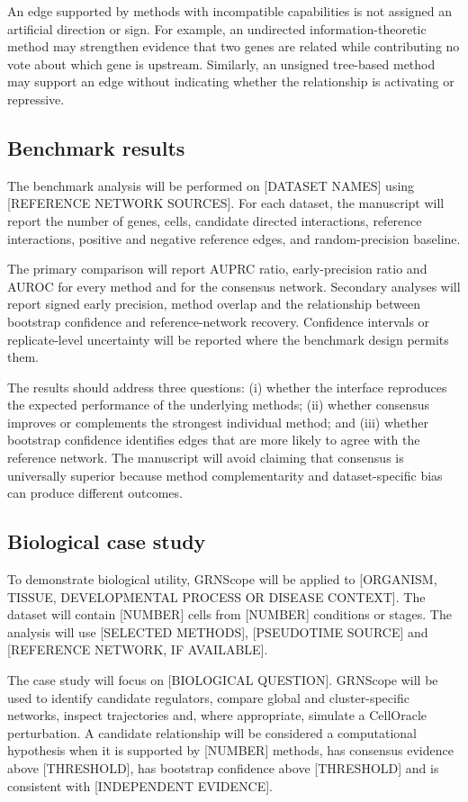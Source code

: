 \documentclass[unnumsec,webpdf,modern,large]{oup-authoring-template}%
\begin{document}
An edge supported by methods with incompatible capabilities is not assigned an artificial direction or sign. For example, an undirected information-theoretic method may strengthen evidence that two genes are related while contributing no vote about which gene is upstream. Similarly, an unsigned tree-based method may support an edge without indicating whether the relationship is activating or repressive.

\subsection{Benchmark results}

The benchmark analysis will be performed on [DATASET NAMES] using [REFERENCE NETWORK SOURCES]. For each dataset, the manuscript will report the number of genes, cells, candidate directed interactions, reference interactions, positive and negative reference edges, and random-precision baseline.

The primary comparison will report AUPRC ratio, early-precision ratio and AUROC for every method and for the consensus network. Secondary analyses will report signed early precision, method overlap and the relationship between bootstrap confidence and reference-network recovery. Confidence intervals or replicate-level uncertainty will be reported where the benchmark design permits them.

The results should address three questions: (i) whether the interface reproduces the expected performance of the underlying methods; (ii) whether consensus improves or complements the strongest individual method; and (iii) whether bootstrap confidence identifies edges that are more likely to agree with the reference network. The manuscript will avoid claiming that consensus is universally superior because method complementarity and dataset-specific bias can produce different outcomes.

\subsection{Biological case study}

To demonstrate biological utility, GRNScope will be applied to [ORGANISM, TISSUE, DEVELOPMENTAL PROCESS OR DISEASE CONTEXT]. The dataset will contain [NUMBER] cells from [NUMBER] conditions or stages. The analysis will use [SELECTED METHODS], [PSEUDOTIME SOURCE] and [REFERENCE NETWORK, IF AVAILABLE].

The case study will focus on [BIOLOGICAL QUESTION]. GRNScope will be used to identify candidate regulators, compare global and cluster-specific networks, inspect trajectories and, where appropriate, simulate a CellOracle perturbation. A candidate relationship will be considered a computational hypothesis when it is supported by [NUMBER] methods, has consensus evidence above [THRESHOLD], has bootstrap confidence above [THRESHOLD] and is consistent with [INDEPENDENT EVIDENCE].
\end{document}
